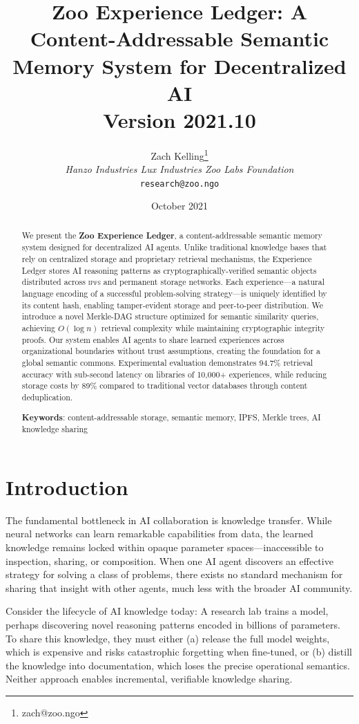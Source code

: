 \documentclass[11pt,letterpaper]{article}
\title{\textbf{Zoo Experience Ledger: A Content-Addressable Semantic Memory System for Decentralized AI}\\
\large Version 2021.10}
\author{
Zach Kelling\thanks{zach@zoo.ngo}\\
\textit{Hanzo Industries \quad Lux Industries \quad Zoo Labs Foundation}\\
\texttt{research@zoo.ngo}
}
\date{October 2021}
\newcommand{\IPFS}{\textsc{ipfs}}
\begin{document}
\zoocoverpage

\begin{abstract}
We present the \textbf{Zoo Experience Ledger}, a content-addressable semantic memory system designed for decentralized AI agents. Unlike traditional knowledge bases that rely on centralized storage and proprietary retrieval mechanisms, the Experience Ledger stores AI reasoning patterns as cryptographically-verified semantic objects distributed across \IPFS{} and permanent storage networks. Each experience---a natural language encoding of a successful problem-solving strategy---is uniquely identified by its content hash, enabling tamper-evident storage and peer-to-peer distribution. We introduce a novel Merkle-DAG structure optimized for semantic similarity queries, achieving $O(\log n)$ retrieval complexity while maintaining cryptographic integrity proofs. Our system enables AI agents to share learned experiences across organizational boundaries without trust assumptions, creating the foundation for a global semantic commons. Experimental evaluation demonstrates 94.7\% retrieval accuracy with sub-second latency on libraries of 10,000+ experiences, while reducing storage costs by 89\% compared to traditional vector databases through content deduplication.

\textbf{Keywords}: content-addressable storage, semantic memory, IPFS, Merkle trees, AI knowledge sharing
\end{abstract}

\section{Introduction}

The fundamental bottleneck in AI collaboration is knowledge transfer. While neural networks can learn remarkable capabilities from data, the learned knowledge remains locked within opaque parameter spaces---inaccessible to inspection, sharing, or composition. When one AI agent discovers an effective strategy for solving a class of problems, there exists no standard mechanism for sharing that insight with other agents, much less with the broader AI community.

Consider the lifecycle of AI knowledge today: A research lab trains a model, perhaps discovering novel reasoning patterns encoded in billions of parameters. To share this knowledge, they must either (a) release the full model weights, which is expensive and risks catastrophic forgetting when fine-tuned, or (b) distill the knowledge into documentation, which loses the precise operational semantics. Neither approach enables incremental, verifiable knowledge sharing.
\end{document}
